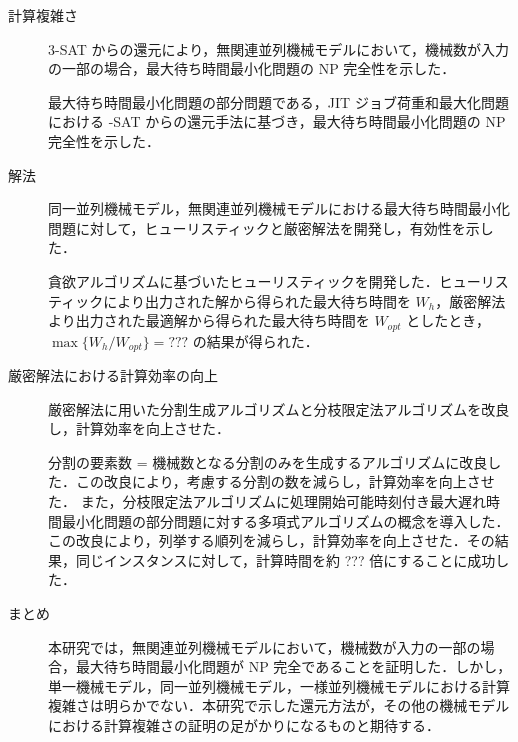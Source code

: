 \documentclass[12pt]{optlab-bachelor}
\begin{document}
\begin{description}
  \item[計算複雑さ ] \textsc{3-SAT} からの還元により，無関連並列機械モデルにおいて，機械数が入力の一部の場合，最大待ち時間最小化問題の NP 完全性を示した．

  最大待ち時間最小化問題の部分問題である，JIT ジョブ荷重和最大化問題における {-SAT} からの還元手法に基づき，最大待ち時間最小化問題の NP  完全性を示した．

  \item[解法 ] 同一並列機械モデル，無関連並列機械モデルにおける最大待ち時間最小化問題に対して，ヒューリスティックと厳密解法を開発し，有効性を示した．

  貪欲アルゴリズムに基づいたヒューリスティックを開発した．ヒューリスティックにより出力された解から得られた最大待ち時間を $W_h$，厳密解法より出力された最適解から得られた最大待ち時間を $W_{opt}$ としたとき，$\max\big\{W_h/W_{opt}\big\} = ???$ の結果が得られた．

  \item[厳密解法における計算効率の向上 ] 厳密解法に用いた分割生成アルゴリズムと分枝限定法アルゴリズムを改良し，計算効率を向上させた．

  分割の要素数 = 機械数となる分割のみを生成するアルゴリズムに改良した．この改良により，考慮する分割の数を減らし，計算効率を向上させた．
  また，分枝限定法アルゴリズムに処理開始可能時刻付き最大遅れ時間最小化問題の部分問題に対する多項式アルゴリズムの概念を導入した．この改良により，列挙する順列を減らし，計算効率を向上させた．その結果，同じインスタンスに対して，計算時間を約 ??? 倍にすることに成功した．

  \item[まとめ ] 本研究では，無関連並列機械モデルにおいて，機械数が入力の一部の場合，最大待ち時間最小化問題が NP 完全であることを証明した．しかし，単一機械モデル，同一並列機械モデル，一様並列機械モデルにおける計算複雑さは明らかでない．本研究で示した還元方法が，その他の機械モデルにおける計算複雑さの証明の足がかりになるものと期待する．
\end{description}
\end{document}
